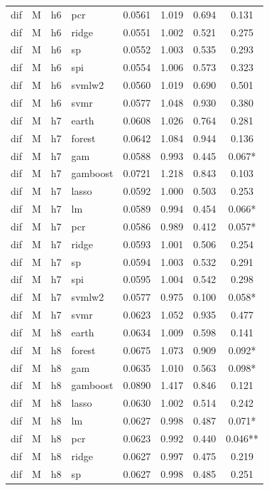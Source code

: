 \begin{ThreePartTable}
\begin{longtable}[t]{llclcccc}
dif & M & h6 & pcr & 0.0561 & 1.019 & 0.694 & 0.131\\
dif & M & h6 & ridge & 0.0551 & 1.002 & 0.521 & 0.275\\
dif & M & h6 & sp & 0.0552 & 1.003 & 0.535 & 0.293\\
dif & M & h6 & spi & 0.0554 & 1.006 & 0.573 & 0.323\\
dif & M & h6 & svmlw2 & 0.0560 & 1.019 & 0.690 & 0.501\\
dif & M & h6 & svmr & 0.0577 & 1.048 & 0.930 & 0.380\\
\addlinespace
dif & M & h7 & earth & 0.0608 & 1.026 & 0.764 & 0.281\\
dif & M & h7 & forest & 0.0642 & 1.084 & 0.944 & 0.136\\
dif & M & h7 & gam & 0.0588 & 0.993 & 0.445 & 0.067*\\
dif & M & h7 & gamboost & 0.0721 & 1.218 & 0.843 & 0.103\\
dif & M & h7 & lasso & 0.0592 & 1.000 & 0.503 & 0.253\\
dif & M & h7 & lm & 0.0589 & 0.994 & 0.454 & 0.066*\\
dif & M & h7 & pcr & 0.0586 & 0.989 & 0.412 & 0.057*\\
dif & M & h7 & ridge & 0.0593 & 1.001 & 0.506 & 0.254\\
dif & M & h7 & sp & 0.0594 & 1.003 & 0.532 & 0.291\\
dif & M & h7 & spi & 0.0595 & 1.004 & 0.542 & 0.298\\
dif & M & h7 & svmlw2 & 0.0577 & 0.975 & 0.100 & 0.058*\\
dif & M & h7 & svmr & 0.0623 & 1.052 & 0.935 & 0.477\\
\addlinespace
dif & M & h8 & earth & 0.0634 & 1.009 & 0.598 & 0.141\\
dif & M & h8 & forest & 0.0675 & 1.073 & 0.909 & 0.092*\\
dif & M & h8 & gam & 0.0635 & 1.010 & 0.563 & 0.098*\\
dif & M & h8 & gamboost & 0.0890 & 1.417 & 0.846 & 0.121\\
dif & M & h8 & lasso & 0.0630 & 1.002 & 0.514 & 0.242\\
dif & M & h8 & lm & 0.0627 & 0.998 & 0.487 & 0.071*\\
dif & M & h8 & pcr & 0.0623 & 0.992 & 0.440 & 0.046**\\
dif & M & h8 & ridge & 0.0627 & 0.997 & 0.475 & 0.219\\
dif & M & h8 & sp & 0.0627 & 0.998 & 0.485 & 0.251\\

\end{longtable}
\end{ThreePartTable}
